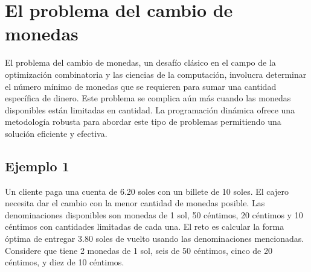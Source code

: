 \section{El problema del cambio de monedas}
El problema del cambio de monedas, un desafío clásico en el campo de la optimización combinatoria y las ciencias de la computación, involucra determinar el número mínimo de monedas que se requieren para sumar una cantidad específica de dinero. Este problema se complica aún más cuando las monedas disponibles están limitadas en cantidad. La programación dinámica ofrece una metodología robusta para abordar este tipo de problemas permitiendo una solución eficiente y efectiva.

\subsection{Ejemplo 1}
Un cliente paga una cuenta de 6.20 soles con un billete de 10 soles. El cajero necesita dar el cambio con la menor cantidad de monedas posible. Las denominaciones disponibles son monedas de 1 sol, 50 céntimos, 20 céntimos y 10 céntimos con cantidades limitadas de cada una. El reto es calcular la forma óptima de entregar 3.80 soles de vuelto usando las denominaciones mencionadas. Considere que tiene 2 monedas de 1 sol, seis de 50 céntimos, cinco de 20 céntimos, y diez de 10 céntimos.

